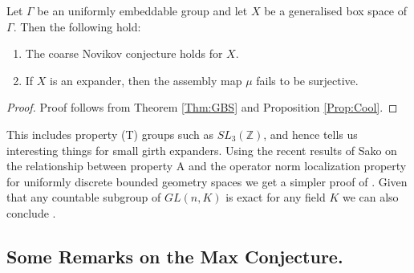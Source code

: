 \begin{conjecture}
\begin{corollary}
Let $\Gamma$ be an uniformly embeddable group and let $X$ be a generalised box space of $\Gamma$. Then the following hold:
\begin{enumerate}
\item The coarse Novikov conjecture holds for $X$.
\item If $X$ is an expander, then the assembly map $\mu$ fails to be surjective.
\end{enumerate}
\end{corollary}
\begin{proof}
Proof follows from Theorem \ref{Thm:GBS} and Proposition \ref{Prop:Cool}.
\end{proof}
This includes property (T) groups such as $SL_{3}(\mathbb{Z})$, and hence tells us interesting things for small girth expanders. Using the recent results of Sako on the relationship between property A and the operator norm localization property for uniformly discrete bounded geometry spaces \cite{AONL-2012} we get a simpler proof of \cite[Theorem 7.1]{MR2419930}. Given that any countable subgroup of $GL(n,K)$ is exact for any field $K$ \cite{MR2217050} we can also conclude \cite[Theorem 5.3]{MR2764895}.

\subsection{Some Remarks on the Max Conjecture.}


\end{conjecture}
